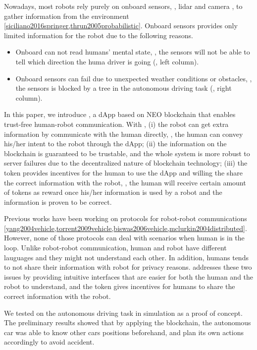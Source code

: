 \documentclass{article}
\begin{document}
Nowadays, most robots rely purely on onboard sensors,
\eg, lidar and camera \etc,
to gather information from the environment
\cref{siciliano2016springer,thrun2005probabilistic}. 
Onboard sensors provides only limited information for the
robot due to the following reasons.
\begin{itemize}
    \item Onboard can not read humans' mental 
        state, \eg, the sensors will not be able to tell 
        which direction the huma driver is going
        (, left column).
    \item Onboard sensors can fail due to unexpected weather
        conditions or obstacles, \eg, the sensors is blocked
        by a tree in the autonomous driving task
        (, right column).
\end{itemize}


In this paper, we introduce \nrc, a dApp based 
on NEO blockchain that enables trust-free human-robot 
communication.
With \nrc, (i) the robot can get extra information
by communicate with the human directly, 
\eg, the human can convey his/her intent to the robot 
through the \nrc dApp; 
(ii) the information on the blockchain is guaranteed to
be trustable, and the whole system is more robust to server
failures due to the decentralized nature of blockchain
technology; (iii) the \nrc token provides incentives
for the human to use the dApp and willing the share the
correct information with the robot, \ie, the human will receive
certain amount of tokens as reward once his/her information
is used by a robot and the information is proven to be correct.


Previous works have been working on 
protocols for robot-robot communications 
\cref{yang2004vehicle,torrent2009vehicle,biswas2006vehicle,mclurkin2004distributed}. 
However, none of those protocols can deal with scenarios
when human is in the loop.
Unlike robot-robot communication, human and robot 
have different lauguages and they might not understand
each other. In addition, humans tends to not share their
information with robot for privacy reasons.
\nrc addresses these two issues by providing intuitive
interfaces that are easier for both the human and the robot
to understand, and the \nrc token gives incentives for humans to
share the correct information with the robot.


We tested \nrc on the autonomous driving task in simulation 
as a proof of concept.
The preliminary results showed that by applying the \nrc
blockchain, the autonomous car was able to know other
cars positions beforehand, and plan its own actions accordingly
to avoid accident.
\end{document}
